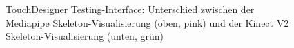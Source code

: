 \begin{figure}[htbp]
    \centering
    \caption{TouchDesigner Testing-Interface: Unterschied zwischen der Mediapipe Skeleton-Visualisierung (oben, pink) und der Kinect V2 Skeleton-Visualisierung (unten, grün)}
    \label{fig:testing_interface}
\end{figure}

